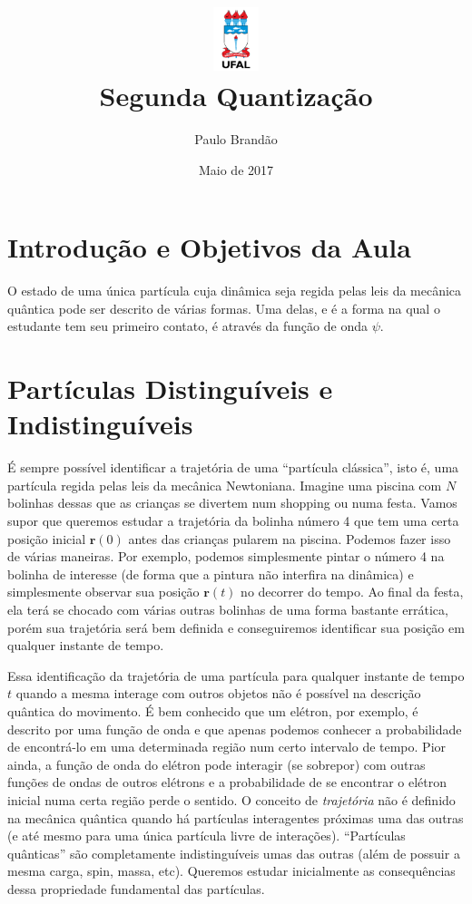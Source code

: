 \documentclass{article}
\title{\includegraphics[width=0.1\textwidth]{ufallogo.png} \\
\Huge{\color{astral}\textbf{Segunda Quantização}}}
\author{Paulo Brandão}
\date{Maio de 2017}
\begin{document}
\maketitle

\section{Introdução e Objetivos da Aula}

O estado de uma única partícula cuja dinâmica seja regida pelas leis da mecânica quântica pode ser descrito de várias formas. Uma delas, e é a forma na qual o estudante tem seu primeiro contato, é através da função de onda $\psi$.
















\section{Partículas Distinguíveis e Indistinguíveis}

É sempre possível identificar a trajetória de uma ``partícula clássica'', isto é, uma partícula regida pelas leis da mecânica Newtoniana. Imagine uma piscina com $N$ bolinhas dessas que as crianças se divertem num shopping ou numa festa. Vamos supor que queremos estudar a trajetória da bolinha número 4 que tem uma certa posição inicial $\mathbf{r}(0)$ antes das crianças pularem na piscina. Podemos fazer isso de várias maneiras. Por exemplo, podemos simplesmente pintar o número 4 na bolinha de interesse (de forma que a pintura não interfira na dinâmica) e simplesmente observar sua posição $\mathbf{r}(t)$ no decorrer do tempo. Ao final da festa, ela terá se chocado com várias outras bolinhas de uma forma bastante errática, porém sua trajetória será bem definida e conseguiremos identificar sua posição em qualquer instante de tempo.

Essa identificação da trajetória de uma partícula para qualquer instante de tempo $t$ quando a mesma interage com outros objetos não é possível na descrição quântica do movimento. É bem conhecido que um elétron, por exemplo, é descrito por uma função de onda e que apenas podemos conhecer a probabilidade de encontrá-lo em uma determinada região num certo intervalo de tempo. Pior ainda, a função de onda do elétron pode interagir (se sobrepor) com outras funções de ondas de outros elétrons e a probabilidade de se encontrar o elétron inicial numa certa região perde o sentido. O conceito de \textit{trajetória} não é definido na mecânica quântica quando há partículas interagentes próximas uma das outras (e até mesmo para uma única partícula livre de interações). ``Partículas quânticas'' são completamente indistinguíveis umas das outras (além de possuir a mesma carga, spin, massa, etc). Queremos estudar inicialmente as consequências dessa propriedade fundamental das partículas.
\end{document}
